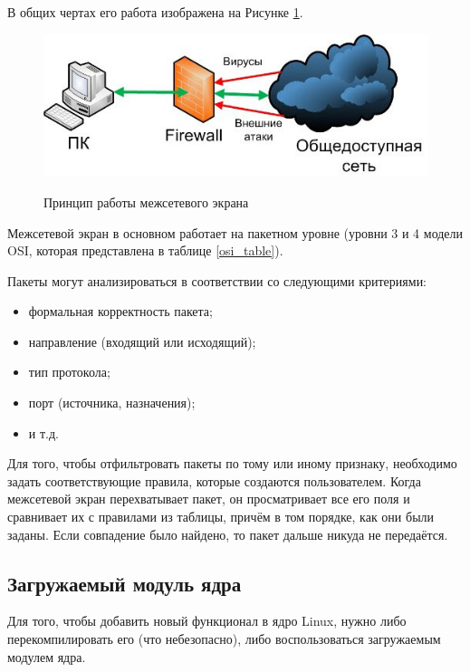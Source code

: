 В общих чертах его работа изображена на Рисунке \ref{fig1:image}.

\begin{figure}[ph!]
	\centering
	\begin{center}
		{\includegraphics[scale=0.5]{img/firewall.jpg}}
		\caption{Принцип работы межсетевого экрана}
		\label{fig1:image}
	\end{center}
\end{figure}

Межсетевой экран в основном работает на пакетном уровне (уровни 3 и 4 модели OSI, которая представлена в таблице \ref{osi_table}). \cite{fw}

Пакеты могут анализироваться в соответствии со следующими критериями: 
\begin{itemize}
	\item формальная корректность пакета;
	\item направление (входящий или исходящий);
	\item тип протокола;
	\item порт (источника, назначения);
	\item и т.д. \\
\end{itemize}

Для того, чтобы отфильтровать пакеты по тому или иному признаку, необходимо задать соответствующие правила, которые создаются пользователем. Когда межсетевой экран перехватывает пакет, он просматривает все его поля и сравнивает их с правилами из таблицы, причём в том порядке, как они были заданы. Если совпадение было найдено, то пакет дальше никуда не передаётся. \newline

\subsection{Загружаемый модуль ядра}
Для того, чтобы добавить новый функционал в ядро Linux, нужно либо перекомпилировать его (что небезопасно), либо воспользоваться загружаемым модулем ядра. \cite{os}

